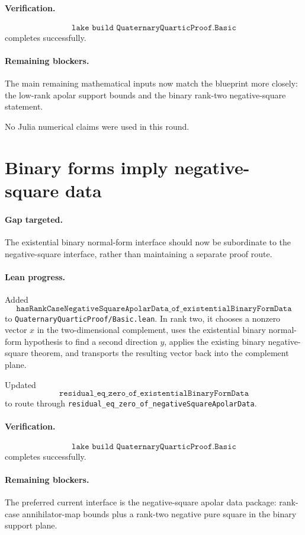 \documentclass[11pt]{article}
\begin{document}
\paragraph{Verification.}
\[
\texttt{lake build QuaternaryQuarticProof.Basic}
\]
completes successfully.

\paragraph{Remaining blockers.}
The main remaining mathematical inputs now match the blueprint more closely:
the low-rank apolar support bounds and the binary rank-two negative-square
statement.

No Julia numerical claims were used in this round.

\section*{Binary forms imply negative-square data}

\paragraph{Gap targeted.}
The existential binary normal-form interface should now be subordinate to the
negative-square interface, rather than maintaining a separate proof route.

\paragraph{Lean progress.}
Added
\[
\texttt{hasRankCaseNegativeSquareApolarData\_of\_existentialBinaryFormData}
\]
to \texttt{QuaternaryQuarticProof/Basic.lean}.  In rank two, it chooses a
nonzero vector \(x\) in the two-dimensional complement, uses the existential
binary normal-form hypothesis to find a second direction \(y\), applies the
existing binary negative-square theorem, and transports the resulting vector
back into the complement plane.

Updated
\[
\texttt{residual\_eq\_zero\_of\_existentialBinaryFormData}
\]
to route through \texttt{residual\_eq\_zero\_of\_negativeSquareApolarData}.

\paragraph{Verification.}
\[
\texttt{lake build QuaternaryQuarticProof.Basic}
\]
completes successfully.

\paragraph{Remaining blockers.}
The preferred current interface is the negative-square apolar data package:
rank-case annihilator-map bounds plus a rank-two negative pure square in the
binary support plane.
\end{document}
